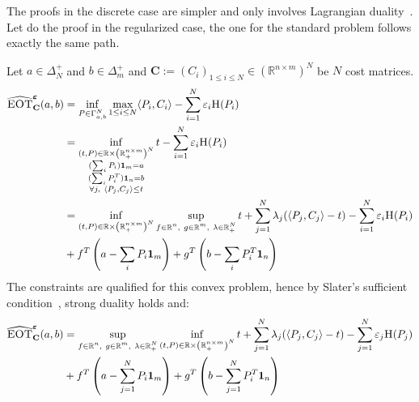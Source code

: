 \begin{prv*}
The proofs in the discrete case are simpler and only involves Lagrangian duality~\citep[Chapter 5]{boyd2004convex}. Let do the  proof in the regularized case, the one for the standard problem follows exactly the same path.

Let $a\in\Delta_N^{+}$ and $b\in\Delta^+_m$ and $\mathbf{C}:=(C_i)_{1\leq i\leq N}\in\left(\mathbb{R}^{n\times m}\right)^N$ be $N$ cost matrices. 
\begin{align*}
    \widehat{\textsc{EOT}}^{\bm{\varepsilon}}_{\mathbf{C}}(a,b)&=\inf_{P\in \Gamma_{a,b}^N} \max_{1\leq i\leq N}\langle P_i,C_i\rangle -\sum_{i=1}^N\varepsilon_i \textsc{H}(P_i) \\
    &=\inf\limits_{\substack{(t,P)\in \mathbb{R}\times\left(\mathbb{R}_+^{n\times m}\right)^N\\(\sum_i P_i)\mathbf{1}_m=a\\
     (\sum_i P_i^T)\mathbf{1}_n=b\\
    \forall j,~\langle P_j,C_j\rangle \leq t}}t -\sum_{i=1}^N\varepsilon_i \textsc{H}(P_i)\\
    &=\inf\limits_{\substack{(t,P)\in \mathbb{R}\times\left(\mathbb{R}_+^{n\times m}\right)^N}}\sup\limits_{\substack{f\in\mathbb{R}^n,~g\in\mathbb{R}^m,~\lambda\in\mathbb{R}_+^N}} t+\sum_{j=1}^N\lambda_j(\langle P_j,C_j\rangle- t) -\sum_{i=1}^N\varepsilon_i \textsc{H}(P_i)\\
    &+f^T\left(a-\sum_i P_i\mathbf{1}_m\right)+g^T\left(b-\sum_i P_i^T\mathbf{1}_n\right)\\
\end{align*}
The constraints are qualified for this convex problem, hence by Slater's sufficient condition~\citep[Section 5.2.3]{boyd2004convex}, strong duality holds and:
\begin{align*}
    \widehat{\MOT}^{\bm{\varepsilon}}_{\mathbf{C}}(a,b)
    &=\sup\limits_{\substack{f\in\mathbb{R}^n,~g\in\mathbb{R}^m,~\lambda\in\mathbb{R}_+^N}}\inf\limits_{\substack{(t,P)\in \mathbb{R}\times\left(\mathbb{R}_+^{n\times m}\right)^N}} t+\sum_{j=1}^N\lambda_j(\langle P_j,C_j\rangle- t) -\sum_{j=1}^N\varepsilon_j \ent(P_j)\\
    &+f^T\left(a-\sum_{j=1}^N P_i\mathbf{1}_m\right)+g^T\left(b-\sum_{j=1}^N P_i^T\mathbf{1}_n\right)\\

\end{align*}
\end{prv*}
